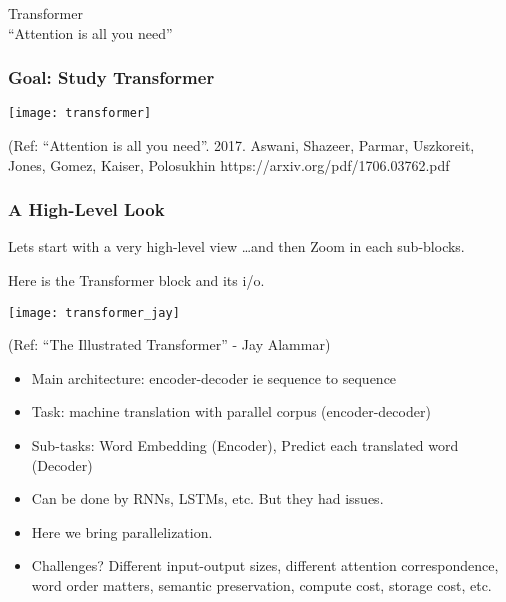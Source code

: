 \begin{frame}[fragile]\frametitle{}
\begin{center}
{\Large Transformer \\ \small ``Attention is all you need''}
\end{center}
\end{frame}



\begin{frame}[fragile]\frametitle{Goal: Study Transformer}


	\begin{center}
	\texttt{[image: transformer]}
	\end{center}		

{\tiny (Ref: ``Attention is all you need''. 2017.  Aswani, Shazeer, Parmar, Uszkoreit,  Jones, Gomez, Kaiser, Polosukhin  https://arxiv.org/pdf/1706.03762.pdf}


			
\end{frame}

\begin{frame}[fragile]\frametitle{A High-Level Look}

Lets start with a very high-level view \ldots and then Zoom in each sub-blocks.

Here is the Transformer block and its i/o.

\begin{center}
\texttt{[image: transformer\_jay]}

{\tiny (Ref: ``The Illustrated Transformer'' - Jay Alammar)}
\end{center}		

\begin{itemize}
\item Main architecture: encoder-decoder ie sequence to sequence
\item Task: machine translation with parallel corpus (encoder-decoder)
\item Sub-tasks: Word Embedding (Encoder), Predict each translated word (Decoder)
\item Can be done by RNNs, LSTMs, etc. But they had issues.
\item Here we bring parallelization.
\item Challenges? Different input-output sizes, different attention correspondence, word order matters, semantic preservation, compute cost, storage cost, etc.
\end{itemize}

			
\end{frame}

